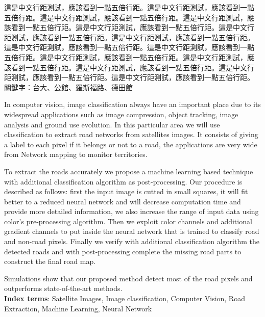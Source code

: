 \begin{abstractzh}
這是中文行距測試，應該看到一點五倍行距。這是中文行距測試，應該看到一點
五倍行距。這是中文行距測試，應該看到一點五倍行距。這是中文行距測試，應
該看到一點五倍行距。這是中文行距測試，應該看到一點五倍行距。這是中文行
距測試，應該看到一點五倍行距。這是中文行距測試，應該看到一點五倍行距。
這是中文行距測試，應該看到一點五倍行距。這是中文行距測試，應該看到一點
五倍行距。這是中文行距測試，應該看到一點五倍行距。這是中文行距測試，應
該看到一點五倍行距。這是中文行距測試，應該看到一點五倍行距。這是中文行
距測試，應該看到一點五倍行距。這是中文行距測試，應該看到一點五倍行距。 \\

\noindent
關鍵字：台大、公館、羅斯福路、德田館
\end{abstractzh}

\begin{abstracten}
In computer vision, image classification always have an important place due to its widespread applications such as image compression, object tracking, image analysis and ground use evolution. In this particular area we will use classification to extract road networks from satellites images. It consists of giving a label to each pixel if it belongs or not to a road, the applications are very wide from Network mapping to monitor territories.

To extract the roads accurately we propose a machine learning based technique with additional classification algorithm as post-processing. Our procedure is described as follows: first the input image is cutted in small squares, it will fit better to a reduced neural network and will decrease computation time and provide more detailed information, we also increase the range of input data using color’s pre-processing algorithm. Then we exploit color channels and additional gradient channels to put inside the neural network that is trained to classify road and non-road pixels. Finally we verify with additional classification algorithm the detected roads and with post-processing complete the missing road parts to construct the final road map.
\newpage

Simulations show that our proposed method detect most of the road pixels and outperforms state-of-the-art methods.\\

\noindent
\textbf{Index terms}: Satellite Images, Image classification, Computer Vision, Road Extraction, Machine Learning, Neural Network
\end{abstracten}
